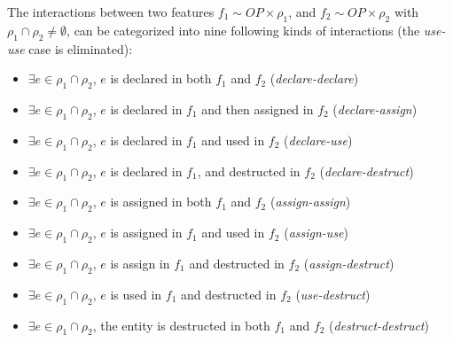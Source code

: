 %

The interactions between two features $f_1 \sim OP \times \rho_1$, and
$f_2 \sim OP \times \rho_2$ with $\rho_1 \cap \rho_2 \neq \emptyset$,
can be categorized into nine following kinds of interactions (the
\textit{use-use} case is eliminated):

\begin{itemize}[leftmargin=4mm]

\item $\exists e \in \rho_1 \cap \rho_2$, $e$ is declared in both $f_1$ and $f_2$ (\textit{declare-declare})

\item $\exists e \in \rho_1 \cap \rho_2$, $e$ is declared in $f_1$ and then assigned in $f_2$ (\textit{declare-assign})

\item $\exists e \in \rho_1 \cap \rho_2$, $e$ is declared in $f_1$ and used in $f_2$ (\textit{declare-use})

\item $\exists e \in \rho_1 \cap \rho_2$, $e$ is declared in $f_1$, and destructed in $f_2$ (\textit{declare-destruct})

\item $\exists e \in \rho_1 \cap \rho_2$, $e$ is assigned in both $f_1$ and $f_2$ (\textit{assign-assign})

\item $\exists e \in \rho_1 \cap \rho_2$, $e$ is assigned in $f_1$ and used in $f_2$ (\textit{assign-use})

\item $\exists e \in \rho_1 \cap \rho_2$, $e$ is assign in $f_1$ and destructed in $f_2$ (\textit{assign-destruct})

\item $\exists e \in \rho_1 \cap \rho_2$, $e$ is used in $f_1$ and destructed in $f_2$ (\textit{use-destruct})

\item $\exists e \in \rho_1 \cap \rho_2$, the entity is destructed in both $f_1$ and $f_2$ (\textit{destruct-destruct})


\end{itemize}


